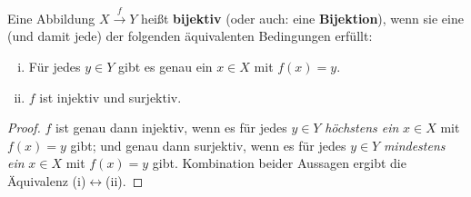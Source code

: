 \begin{defin} \label{def:bijektiv} 
    Eine Abbildung $X \xrightarrow{f} Y$ heißt \textbf{bijektiv} (oder auch: eine \textbf{Bijektion}), wenn sie eine (und damit jede) der folgenden äquivalenten Bedingungen erfüllt:
    \begin{enumerate}[(i)]
        \item Für jedes $y\in Y$ gibt es genau ein $x\in X$ mit $f(x)=y$.
        \item $f$ ist injektiv und surjektiv.
    \end{enumerate}
\end{defin}
\begin{proof}
    $f$ ist genau dann injektiv, wenn es für jedes $y\in Y$ \emph{höchstens ein} $x\in X$ mit $f(x)=y$ gibt; und genau dann surjektiv, wenn es für jedes $y\in Y$ \emph{mindestens ein} $x\in X$ mit $f(x)=y$ gibt. Kombination beider Aussagen ergibt die Äquivalenz (i)$\leftrightarrow$(ii).
\end{proof}


